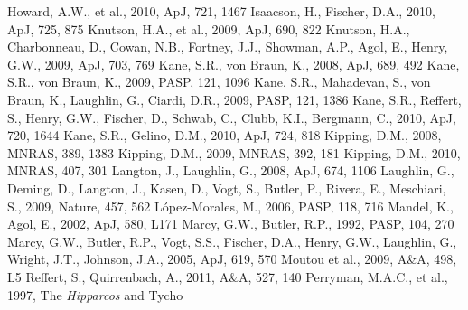 \documentclass[12pt,preprint]{emulateapj}
\begin{document}
\begin{thebibliography}{}
  Howard, A.W., et al., 2010, ApJ, 721, 1467
  Isaacson, H., Fischer, D.A., 2010, ApJ, 725, 875
  Knutson, H.A., et al., 2009, ApJ, 690, 822
  Knutson, H.A., Charbonneau, D., Cowan, N.B., Fortney, J.J., Showman,
  A.P., Agol, E., Henry, G.W., 2009, ApJ, 703, 769
  Kane, S.R., von Braun, K., 2008, ApJ, 689, 492
  Kane, S.R., von Braun, K., 2009, PASP, 121, 1096
 Kane,
  S.R., Mahadevan, S., von Braun, K., Laughlin, G., Ciardi, D.R.,
  2009, PASP, 121, 1386
 Kane,
  S.R., Reffert, S., Henry, G.W., Fischer, D., Schwab, C., Clubb,
  K.I., Bergmann, C., 2010, ApJ, 720, 1644
 Kane,
  S.R., Gelino, D.M., 2010, ApJ, 724, 818
 Kipping, D.M.,
  2008, MNRAS, 389, 1383
 Kipping, D.M.,
  2009, MNRAS, 392, 181
 Kipping, D.M.,
  2010, MNRAS, 407, 301
  Langton, J., Laughlin, G., 2008, ApJ, 674, 1106
  Laughlin, G., Deming, D., Langton, J., Kasen, D., Vogt, S., Butler,
  P., Rivera, E., Meschiari, S., 2009, Nature, 457, 562
  L\'opez-Morales, M., 2006, PASP, 118, 716
  Mandel, K., Agol, E., 2002, ApJ, 580, L171
  Marcy, G.W., Butler, R.P., 1992, PASP, 104, 270
 Marcy,
  G.W., Butler, R.P., Vogt, S.S., Fischer, D.A., Henry, G.W.,
  Laughlin, G., Wright, J.T., Johnson, J.A., 2005, ApJ, 619, 570
 Moutou
  et al., 2009, A\&A, 498, L5
  Reffert, S., Quirrenbach, A., 2011, A\&A, 527, 140
  Perryman, M.A.C., et al., 1997, The {\it Hipparcos} and Tycho

\end{thebibliography}
\end{document}
